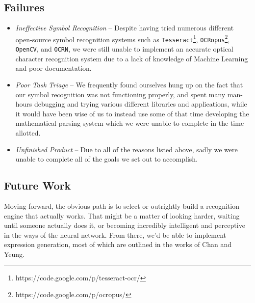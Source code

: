 \documentclass{acm_proc_article-sp}
\begin{document}
\subsection{Failures}
\begin{itemize}
	\item{\emph{Ineffective Symbol Recognition}} -- Despite having tried numerous different open-source symbol recognition systems such as \texttt{Tesseract}\footnote{https://code.google.com/p/tesseract-ocr/}, \texttt{OCRopus}\footnote{https://code.google.com/p/ocropus/}, \texttt{OpenCV}, and \texttt{OCRN}, we were still unable to implement an accurate optical character recognition system due to a lack of knowledge of Machine Learning and poor documentation.
	\item{\emph{Poor Task Triage}} -- We frequently found ourselves hung up on the fact that our symbol recognition was not functioning properly, and spent many man-hours debugging and trying various different libraries and applications, while it would have been wise of us to instead use some of that time developing the mathematical parsing system which we were unable to complete in the time allotted.
	\item{\emph{Unfinished Product}} -- Due to all of the reasons listed above, sadly we were unable to complete all of the goals we set out to accomplish.
	
	\end{itemize}

\subsection{Future Work}
Moving forward, the obvious path is to select or outrightly build a recognition engine that actually works. That might be a matter of looking harder, waiting until someone actually does it, or becoming incredibly intelligent and perceptive in the ways of the neural network. From there, we'd be able to implement expression generation, most of which are outlined in the works of Chan and Yeung\cite{chan_mathematical_2000}. 
\end{document}
